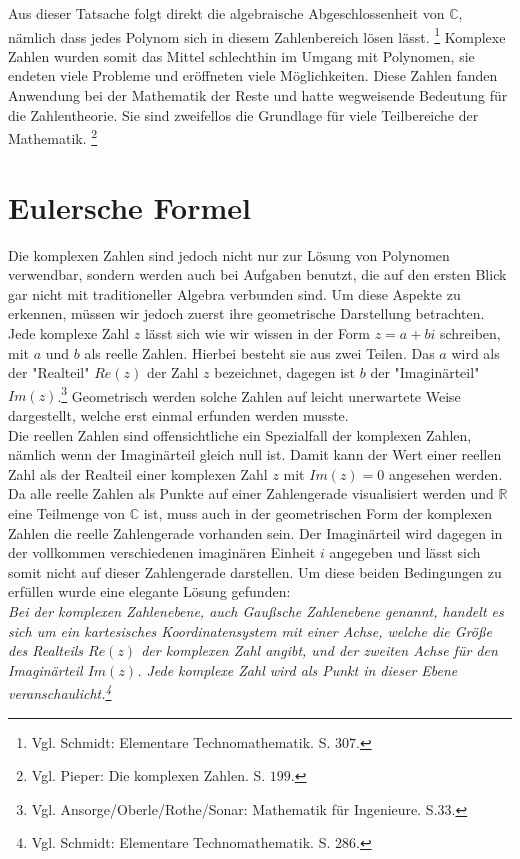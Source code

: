 \documentclass[a4paper,12pt]{article} %
\begin{document}
Aus dieser Tatsache folgt direkt die algebraische Abgeschlossenheit von $\mathbb{C}$, nämlich dass jedes Polynom sich in diesem Zahlenbereich lösen lässt.
\footnote{Vgl. Schmidt: Elementare Technomathematik. S. $307$.} 
Komplexe Zahlen wurden somit das Mittel schlechthin im Umgang mit Polynomen, sie endeten viele Probleme und eröffneten viele Möglichkeiten.
Diese Zahlen fanden Anwendung bei der Mathematik der Reste und hatte wegweisende Bedeutung für die Zahlentheorie.
Sie sind zweifellos die Grundlage für viele Teilbereiche der Mathematik. 
\footnote{Vgl. Pieper: Die komplexen Zahlen. S. $199$.}
\newpage


\section{Eulersche Formel}

Die komplexen Zahlen sind jedoch nicht nur zur Lösung von Polynomen verwendbar, sondern werden auch bei Aufgaben benutzt, die auf den ersten Blick gar nicht mit traditioneller Algebra verbunden sind.
Um diese Aspekte zu erkennen, müssen wir jedoch zuerst ihre geometrische Darstellung betrachten.\\

Jede komplexe Zahl $z$ lässt sich wie wir wissen in der Form $z=a+bi$ schreiben, mit $a$ und $b$ als reelle Zahlen.
Hierbei besteht sie aus zwei Teilen.
Das $a$ wird als der "Realteil" {} $Re(z)$ der Zahl $z$ bezeichnet, dagegen ist $b$ der "{Imaginärteil}" {} $Im(z)$.\footnote{Vgl. Ansorge/Oberle/Rothe/Sonar: Mathematik für Ingenieure. S.33.}
Geometrisch werden solche Zahlen auf leicht unerwartete Weise dargestellt, welche erst einmal erfunden werden musste.\\

Die reellen Zahlen sind offensichtliche ein Spezialfall der komplexen Zahlen, nämlich wenn der Imaginärteil gleich null ist.
Damit kann der Wert einer reellen Zahl als der Realteil einer komplexen Zahl $z$ mit $Im(z)=0$ angesehen werden.
Da alle reelle Zahlen als Punkte auf einer Zahlengerade visualisiert werden und $\mathbb{R}$ eine Teilmenge von $\mathbb{C}$ ist, muss auch in der geometrischen Form der komplexen Zahlen die reelle Zahlengerade vorhanden sein.
Der Imaginärteil wird dagegen in der vollkommen verschiedenen imaginären Einheit $i$ angegeben und lässt sich somit nicht auf dieser Zahlengerade darstellen.
Um diese beiden Bedingungen zu erfüllen wurde eine elegante Lösung gefunden:\\


\noindent \emph{Bei der komplexen Zahlenebene, auch Gaußsche Zahlenebene genannt, handelt es sich um ein kartesisches Koordinatensystem mit einer Achse, welche die Größe des Realteils $Re(z)$ der komplexen Zahl angibt, und der zweiten Achse für den Imaginärteil $Im(z)$. Jede komplexe Zahl wird als Punkt in dieser Ebene veranschaulicht.\footnote{Vgl. Schmidt: Elementare Technomathematik. S. $286$.}}\\
\end{document}
